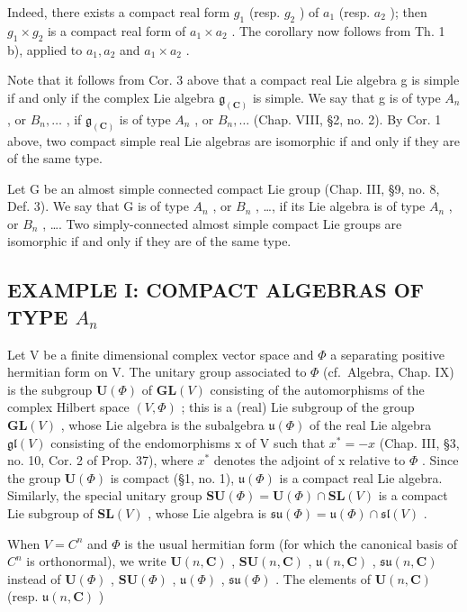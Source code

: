 Indeed, there exists a compact real form \(g_{1}\) (resp. \(g_{2}\) ) of \(a_{1}\) (resp. \(a_{2}\) ); then \(g_{1} \times g_{2}\) is a compact real form of \(a_{1} \times a_{2}\) . The corollary now follows from Th. 1 b), applied to \(a_{1}, a_{2}\) and \(a_{1} \times a_{2}\) .

Note that it follows from Cor. 3 above that a compact real Lie algebra g is simple if and only if the complex Lie algebra \(\mathfrak{g}_{(\mathbf{C})}\) is simple. We say that g is of type \(A_{n}\) , or \(B_{n}, \ldots\) , if \(\mathfrak{g}_{(\mathbf{C})}\) is of type \(A_{n}\) , or \(B_{n}, \ldots\) (Chap. VIII, §2, no. 2). By Cor. 1 above, two compact simple real Lie algebras are isomorphic if and only if they are of the same type.

Let G be an almost simple connected compact Lie group (Chap. III, §9, no. 8, Def. 3). We say that G is of type \(A_{n}\) , or \(B_{n}\) , \ldots, if its Lie algebra is of type \(A_{n}\) , or \(B_{n}\) , \ldots. Two simply-connected almost simple compact Lie groups are isomorphic if and only if they are of the same type.

\subsection{\texorpdfstring{EXAMPLE I: COMPACT ALGEBRAS OF TYPE \(A_{n}\)}{EXAMPLE I: COMPACT ALGEBRAS OF TYPE A\_\{n\}}}

Let V be a finite dimensional complex vector space and \(\Phi\) a separating positive hermitian form on V. The unitary group associated to \(\Phi\) (cf.~Algebra, Chap. IX) is the subgroup \(\mathbf{U}(\Phi)\) of \(\mathbf{GL}(V)\) consisting of the automorphisms of the complex Hilbert space \((V,\Phi)\) ; this is a (real) Lie subgroup of the group \(\mathbf{GL}(V)\) , whose Lie algebra is the subalgebra \(\mathfrak{u}(\Phi)\) of the real Lie algebra \(\mathfrak{gl}(V)\) consisting of the endomorphisms x of V such that \(x^{*} = -x\) (Chap. III, §3, no. 10, Cor. 2 of Prop. 37), where \(x^{*}\) denotes the adjoint of x relative to \(\Phi\) . Since the group \(\mathbf{U}(\Phi)\) is compact (§1, no. 1), \(\mathfrak{u}(\Phi)\) is a compact real Lie algebra. Similarly, the special unitary group \(\mathbf{SU}(\Phi) = \mathbf{U}(\Phi) \cap \mathbf{SL}(V)\) is a compact Lie subgroup of \(\mathbf{SL}(V)\) , whose Lie algebra is \(\mathfrak{su}(\Phi) = \mathfrak{u}(\Phi) \cap \mathfrak{sl}(V)\) .

When \(V = C^{n}\) and \(\varPhi\) is the usual hermitian form (for which the canonical basis of \(C^{n}\) is orthonormal), we write \(\mathbf{U}(n, \mathbf{C})\) , \(\mathbf{SU}(n, \mathbf{C})\) , \(\mathfrak{u}(n, \mathbf{C})\) , \(\mathfrak{s}\mathfrak{u}(n, \mathbf{C})\) instead of \(\mathbf{U}(\varPhi)\) , \(\mathbf{SU}(\varPhi)\) , \(\mathfrak{u}(\varPhi)\) , \(\mathfrak{s}\mathfrak{u}(\varPhi)\) . The elements of \(\mathbf{U}(n, \mathbf{C})\) (resp. \(\mathfrak{u}(n, \mathbf{C})\) )

